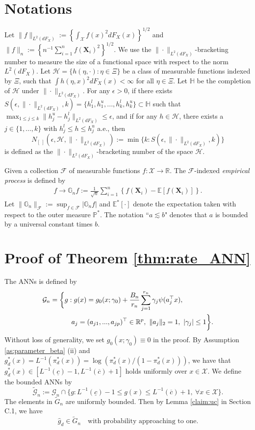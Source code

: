\documentclass[11pt]{article}
\def\bs{\boldsymbol}
\numberwithin{equation}{section}
\begin{document}
\section{Notations}

Let $\|f\|_{L^2(dF_X)}:=\left\{\int_{\mathcal{X}} f(x)^2dF_X(x)\right\}^{1/2}$ and $\|f\|_{n}:=\left\{n^{-1} \sum_{i=1}^nf(\boldsymbol{X}_i)^2\right\}^{1/2}$.
We use the $\|\cdot\|_{L^2(dF_X)}$-bracketing number to measure the size of a functional space with respect to the norm $L^2(dF_X)$. Let $\mathcal{H}=\{h(\eta,\cdot):\eta\in \Xi \}$ be a class of measurable functions indexed by $\Xi$, such that $\int h(\eta,x)^2dF_X(x)<\infty$ for all $\eta\in \Xi$. Let $\mathbb{H}$ be the completion of $\mathcal{H}$ under $\|\cdot\|_{L^2(dF_X)}$. For any $\epsilon>0$, if there exists $S(\epsilon,\|\cdot\|_{L^2(dF_X)},k)=\{h_1^l,h_1^u,...,h_k^l,h_k^u\}\subset \mathbb{H}$ such that $\max_{1\leq j\leq k}\|h_j^u-h_j^l\|_{L^2(dF_X)}\leq \epsilon$, and if for any $h\in \mathcal{H}$, there exists a $j\in\{1,...,k\}$ with $h_j^l\leq h\leq h_j^u$ a.e., then $$N_{[\ ]}(\epsilon,\mathcal{H},\|\cdot\|_{L^2(dF_X)}):=\min\{k:S(\epsilon,\|\cdot\|_{L^2(dF_X)},k) \}$$
is defined as the $\|\cdot\|_{L^2(dF_X)}$-bracketing number of the space $\mathcal{H}$.


Given a collection $\mathcal{F}$ of measurable functions $f:\mathcal{X}\to\mathbb{R}$. The  $\mathcal{F}$-indexed \emph{empirical process} is defined by
\begin{align*}
	f\to \mathbb{G}_n f:=\frac{1}{\sqrt{n}}\sum_{i=1}^n\left\{f(\bs{X}_i)-\mathbb{E}[f(\bs{X}_i)]\right\}.
\end{align*}
Let $\|\mathbb{G}_n\|_{\mathcal{F}}:=\sup_{f\in\mathcal{F}}|\mathbb{G}_n f|$ and  $\mathbb{E}^*[\cdot]$ denote the expectation taken with respect to the outer measure $\mathbb{P}^*$. The notation ``$a \lesssim b$" denotes that $a$ is bounded by a universal constant times $b$.



\section{Proof of Theorem \ref{thm:rate_ANN}}\label{app:rate_ANN}
The ANNs is defined by
\begin{align*}
	\mathcal{G}_n=\bigg\{&g:g(x)=g_0(x;\gamma_0)+\frac{B_n}{r_n}\sum_{j=1}^{r_n} \gamma_j\psi(a_j^\top x),  \notag\\ & \quad a_j=(a_{j1},...,a_{jp})^\top\in\mathbb{R}^p,\  \|a_{j}\|_2= 1, \ |\gamma_j|\leq 1   \bigg\}.
\end{align*}
Without loss of generality, we set $g_0(x;\gamma_0)\equiv 0$ in the proof.
By Assumption \ref{as:parameter_beta} (ii) and $g_d^*(x)=L^{-1}(\pi_d^*(x))=\log\left(\pi_d^*(x)/(1-\pi_d^*(x))\right)$, we have that  $g_d^*(x)\in [L^{-1}(\underline{c})-1,L^{-1}(\overline{c})+1]$ holds uniformly over $x\in\mathcal{X}$. We define the bounded ANNs by $$\widetilde{\mathcal{G}}_n:=\mathcal{G}_n\cap \{g: L^{-1}(\underline{c})-1\leq g(x)\leq  L^{-1}(\overline{c})+1,\  \forall x\in\mathcal{X}\}.$$
The elements in $\widetilde{G}_n$ are uniformly bounded.    Then by Lemma \ref{claim:uc} in Section C.1, we have  $$\widehat{g}_d\in \widetilde{G}_n \quad   \text{with probability approaching to one}.$$
\end{document}
